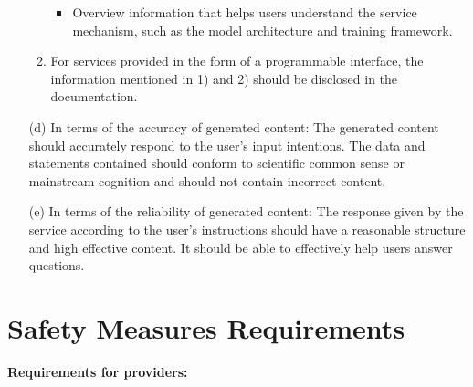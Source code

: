 \documentclass{article}
\begin{document}
\begin{itemize}
\begin{enumerate}
\begin{itemize}
            \item Overview information that helps users understand the service mechanism, such as the model architecture and training framework.
        \end{itemize}
        \item For services provided in the form of a programmable interface, the information mentioned in 1) and 2) should be disclosed in the documentation.
    \end{enumerate}
    \item[(d)] In terms of the accuracy of generated content: The generated content should accurately respond to the user's input intentions. The data and statements contained should conform to scientific common sense or mainstream cognition and should not contain incorrect content.
    \item[(e)] In terms of the reliability of generated content: The response given by the service according to the user's instructions should have a reasonable structure and high effective content. It should be able to effectively help users answer questions.
\end{itemize}

\section{Safety Measures Requirements}

\textbf{Requirements for providers:}
\end{document}
